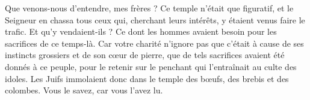 Que venons-nous d’entendre, mes frères ? Ce temple n’était que figuratif, et le Seigneur en chassa tous ceux qui, cherchant leurs intérêts, y étaient venus faire le trafic. Et qu’y vendaient-ils ? Ce dont les hommes avaient besoin pour les sacrifices de ce temps-là. Car votre charité n’ignore pas que c’était à cause de ses instincts grossiers et de son cœur de pierre, que de tels sacrifices avaient été donnés à ce peuple, pour le retenir sur le penchant qui l’entraînait au culte des idoles. Les Juifs immolaient donc dans le temple des bœufs, des brebis et des colombes. Vous le savez, car vous l’avez lu.
